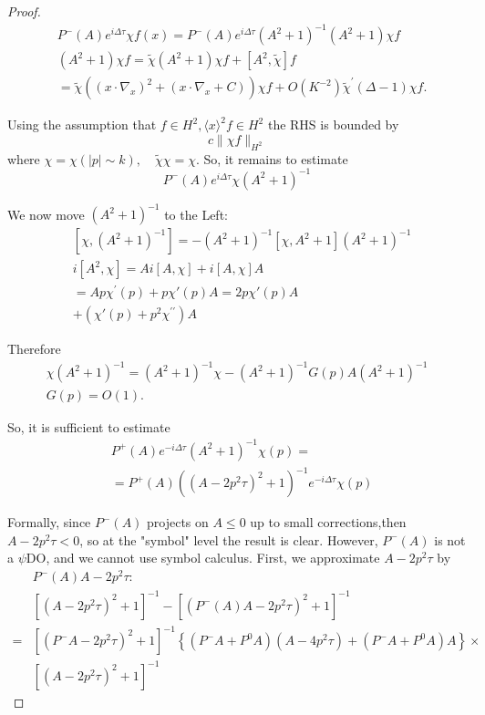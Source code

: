 \documentclass[11pt]{article}
\begin{document}
\begin{proof}
$$
\begin{aligned}
& P^{-}(A) e^{i \Delta \tau} \chi f(x)=P^{-}(A) e^{i \Delta\tau}\left(A^{2}+1\right)^{-1}\left(A^{2}+1\right)\chi  f \\
& \left(A^{2}+1\right) \chi f=\tilde{\chi}\left(A^{2}+1\right)\chi f+\left[A^{2},\tilde \chi \right] f \\
& =\tilde \chi\left(\left(x \cdot\nabla_{x}\right)^{2}+\left(x \cdot \nabla_{x}+C\right)\right )\chi f+O(K^{-2})\tilde \chi^{\prime}(\Delta-1)\chi f.
\end{aligned}
$$

Using the assumption that $f \in H^{2},\langle x\rangle^{2} f \in H^{2}$ the RHS is bounded by
$$
c\| \chi f\|_{H^{2}}
$$
where $\chi=\chi(|p| \sim k), \quad \tilde\chi \chi =\chi$.
So, it remains to estimate
$$
P^{-}(A) e^{i \Delta \tau} \chi\left(A^{2}+1\right)^{-1}
$$

We now move $\left(A^{2}+1\right)^{-1}$ to the Left:
$$
\begin{aligned}
& {\left[\chi,\left(A^{2}+1\right)^{-1}\right]=-\left(A^{2}+1\right)^{-1}\left[\chi, A^{2}+1\right]\left(A^{2}+1\right)^{-1}} \\
& i\left[A^{2},\chi \right]=A i[A,\chi ]+i[A, \chi] A \\
& =A p \chi^{\prime}(p)+p \chi{\prime}(p) A=2 p \chi{\prime}(p) A \\
& +\left(\chi{\prime}(p)+p^{2} \chi^{\prime \prime}\right) A
\end{aligned}
$$

Therefore
$$
\begin{gathered}
\chi\left(A^{2}+1\right)^{-1}=\left(A^{2}+1\right)^{-1} \chi-\left(A^{2}+1\right)^{-1} G(p) A\left(A^{2}+1\right)^{-1} \\
G(p)=O(1) .
\end{gathered}
$$


So, it is sufficient to estimate
$$
\begin{aligned}
& P^{+}(A) e^{-i \Delta \tau}\left(A^{2}+1\right)^{-1} \chi(p)= \\
& =P^{+}(A)\left(\left(A-2 p^{2} \tau\right)^{2}+1\right)^{-1} e^{-i \Delta \tau} \chi(p)
\end{aligned}
$$

Formally, since $P^{-}(A)$ projects on $A \leq 0$ up to small corrections,then $A-2 p^{2} \tau<0$, so at the "symbol" level the result is clear.
However, $P^{-}(A)$ is not a $\psi$DO, and we cannot use symbol calculus.
First, we approximate $A-2 p^{2} \tau$ by
$$
\begin{aligned}
& P^{-}(A) A-2 p^{2} \tau: \\
& {\left[\left(A-2 p^{2} \tau\right)^{2}+1\right]^{-1}-\left[\left(P^{-}(A) A-2 p^{2} \tau\right)^{2}+1\right]^{-1} } \\
= & {\left[\left(P^{-} A-2 p^{2} \tau\right)^{2}+1\right]^{-1}\left\{\left(P^{-} A+P^{0} A\right)\left(A-4 p^{2} \tau\right)+\left(P^{-} A+P^{0} A\right) A\right\} \times } \\
& {\left[\left(A-2 p^{2} \tau\right)^{2}+1\right]^{-1} }
\end{aligned}
$$


\end{proof}
\end{document}
